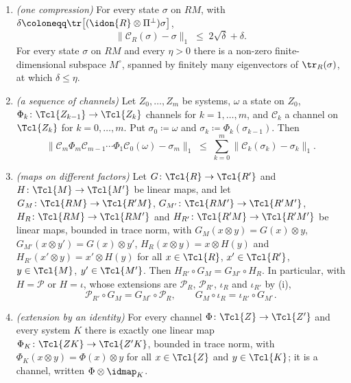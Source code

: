 \begin{lemma}
\begin{enumerate}[label=(\roman*),leftmargin=2.6em]
  $y\in\Tcl{R_2M}$ and $z\in\Tcl{R_2M^{\circ}}$. The channel
  $\mathcal{C}_R\coloneqq\iota_R\circ\mathcal{P}_R$ on $\Tcl{RM}$ is the
  \emph{compression of $M$ onto $M^{\circ}$}.
\item \emph{(one compression)} For every state $\sigma$ on $RM$, with
  $\delta\coloneqq\tr\big[(\idon{R}\otimes\Pi^{\perp})\sigma\big]$,
  \begin{equation}\label{eq:compression-bound}
    \big\|\mathcal{C}_R(\sigma)-\sigma\big\|_1\;\le\;2\sqrt{\delta}+\delta .
  \end{equation}
  For every state $\sigma$ on $RM$ and every $\eta>0$ there is a non-zero
  finite-dimensional subspace $M^{\circ}$, spanned by finitely many
  eigenvectors of $\tr_R(\sigma)$, at which $\delta\le\eta$.
\item \emph{(a sequence of channels)} Let $Z_0,\dots,Z_m$ be systems, $\omega$
  a state on $Z_0$, $\Phi_k\colon\Tcl{Z_{k-1}}\to\Tcl{Z_k}$ channels for
  $k=1,\dots,m$, and $\mathcal{C}_k$ a channel on $\Tcl{Z_k}$ for
  $k=0,\dots,m$. Put $\sigma_0\coloneqq\omega$ and
  $\sigma_k\coloneqq\Phi_k(\sigma_{k-1})$. Then
  \begin{equation}\label{eq:compression-sequence}
    \big\|\mathcal{C}_m\Phi_m\mathcal{C}_{m-1}\cdots\Phi_1\mathcal{C}_0(\omega)
      -\sigma_m\big\|_1
    \;\le\;\sum_{k=0}^{m}\big\|\mathcal{C}_k(\sigma_k)-\sigma_k\big\|_1 .
  \end{equation}
\item \emph{(maps on different factors)} Let $G\colon\Tcl{R}\to\Tcl{R'}$ and
  $H\colon\Tcl{M}\to\Tcl{M'}$ be linear maps, and let
  $G_M\colon\Tcl{RM}\to\Tcl{R'M}$, $G_{M'}\colon\Tcl{RM'}\to\Tcl{R'M'}$,
  $H_R\colon\Tcl{RM}\to\Tcl{RM'}$ and $H_{R'}\colon\Tcl{R'M}\to\Tcl{R'M'}$ be
  linear maps, bounded in trace norm, with $G_M(x\otimes y)=G(x)\otimes y$,
  $G_{M'}(x\otimes y')=G(x)\otimes y'$, $H_R(x\otimes y)=x\otimes H(y)$ and
  $H_{R'}(x'\otimes y)=x'\otimes H(y)$ for all $x\in\Tcl{R}$,
  $x'\in\Tcl{R'}$, $y\in\Tcl{M}$, $y'\in\Tcl{M'}$. Then
  $H_{R'}\circ G_M=G_{M'}\circ H_R$. In particular, with $H=\mathcal{P}$ or
  $H=\iota$, whose extensions are $\mathcal{P}_R$, $\mathcal{P}_{R'}$,
  $\iota_R$ and $\iota_{R'}$ by (i),
  \begin{equation}\label{eq:compression-commute}
    \mathcal{P}_{R'}\circ G_M=G_{M^{\circ}}\circ\mathcal{P}_R,
    \qquad
    G_M\circ\iota_R=\iota_{R'}\circ G_{M^{\circ}} .
  \end{equation}
\item \emph{(extension by an identity)} For every channel
  $\Phi\colon\Tcl{Z}\to\Tcl{Z'}$ and every system $K$ there is exactly one
  linear map $\Phi_K\colon\Tcl{ZK}\to\Tcl{Z'K}$, bounded in trace norm, with
  $\Phi_K(x\otimes y)=\Phi(x)\otimes y$ for all $x\in\Tcl{Z}$ and
  $y\in\Tcl{K}$; it is a channel, written $\Phi\otimes\idmap_K$.
\end{enumerate}
\end{lemma}

